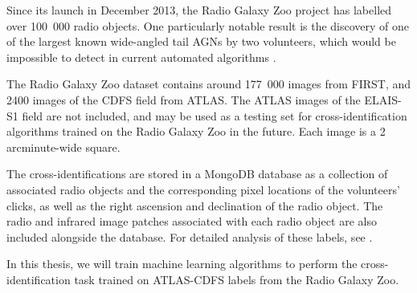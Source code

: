     Since its launch in December 2013, the Radio Galaxy Zoo project has labelled
    over 100~000 radio objects. One particularly notable result is the discovery
    of one of the largest known wide-angled tail AGNs by two volunteers, which
    would be impossible to detect in current automated algorithms
    \citep{banfield16}.

    The Radio Galaxy Zoo dataset contains around 177~000 images from FIRST, and
    2400 images of the CDFS field from ATLAS. The ATLAS images of the ELAIS-S1
    field are not included, and may be used as a testing set for
    cross-identification algorithms trained on the Radio Galaxy Zoo in the
    future. Each image is a 2 arcminute-wide square.

    The cross-identifications are stored in a MongoDB database as a collection
    of associated radio objects and the corresponding pixel locations of the
    volunteers' clicks, as well as the right ascension and declination of the
    radio object. The radio and infrared image patches associated with each
    radio object are also included alongside the database. For detailed analysis
    of these labels, see \citet{atlas-ml}.

    In this thesis, we will train machine learning algorithms to perform the
    cross-identification task trained on ATLAS-CDFS labels from the Radio Galaxy
    Zoo.



